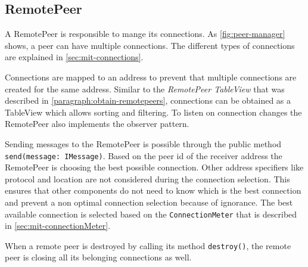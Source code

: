 \subsection{RemotePeer}\label{sec:mit-remotePeer}
A RemotePeer is responsible to mange its connections. As \vref{fig:peer-manager} shows, a peer can have multiple connections. The different types of connections are explained in \vref{sec:mit-connections}.

Connections are mapped to an address to prevent that multiple connections are created for the same address. Similar to the \textit{RemotePeer TableView} that was described in \vref{paragraph:obtain-remotepeers}, connections can be obtained as a TableView which allows sorting and filtering. To listen on connection changes the RemotePeer also implements the observer pattern.

Sending messages to the RemotePeer is possible through the public method \lstinline[breaklines=false]|send(message: IMessage)|. Based on the peer id of the receiver address the RemotePeer is choosing the best possible connection. Other address specifiers like protocol and location are not considered during the connection selection. This ensures that other components do not need to know which is the best connection and prevent a non optimal connection selection because of ignorance.
The best available connection is selected based on the \lstinline|ConnectionMeter| that is described in \vref{sec:mit-connectionMeter}.

When a remote peer is destroyed by calling its method \lstinline|destroy()|, the remote peer is closing all its belonging connections as well.